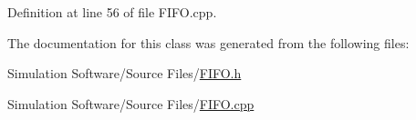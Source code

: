 Definition at line 56 of file F\+I\+F\+O.\+cpp.



The documentation for this class was generated from the following files\+:\begin{DoxyCompactItemize}
\item 
Simulation Software/\+Source Files/\hyperlink{_f_i_f_o_8h}{F\+I\+F\+O.\+h}\item 
Simulation Software/\+Source Files/\hyperlink{_f_i_f_o_8cpp}{F\+I\+F\+O.\+cpp}\end{DoxyCompactItemize}
